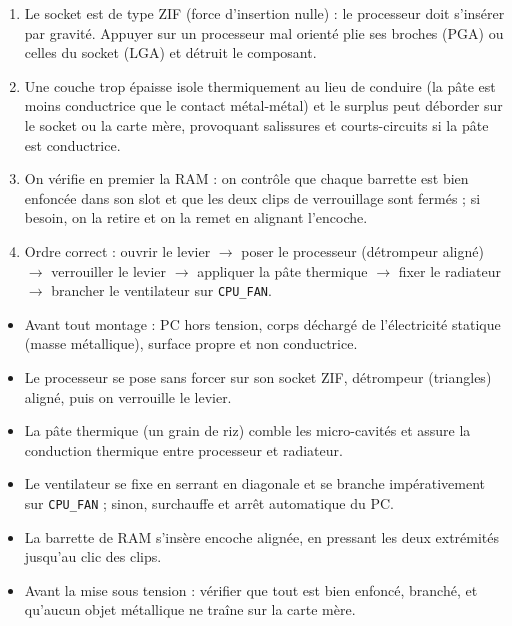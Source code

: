 \documentclass[11pt]{article}
\newcommand{\cle}[1]{{\popxbold\color{popdark}#1}}
\begin{document}
\begin{corrige}[Exercice]
\begin{enumerate}
  \item Le socket est de type ZIF (force d'insertion nulle) : le processeur doit s'insérer par gravité. Appuyer sur un processeur mal orienté plie ses broches (PGA) ou celles du socket (LGA) et détruit le composant.
  \item Une couche trop épaisse isole thermiquement au lieu de conduire (la pâte est moins conductrice que le contact métal-métal) et le surplus peut déborder sur le socket ou la carte mère, provoquant salissures et courts-circuits si la pâte est conductrice.
  \item On vérifie en premier la RAM : on contrôle que chaque barrette est bien enfoncée dans son slot et que les deux clips de verrouillage sont fermés ; si besoin, on la retire et on la remet en alignant l'encoche.
  \item Ordre correct : ouvrir le levier $\rightarrow$ poser le processeur (détrompeur aligné) $\rightarrow$ verrouiller le levier $\rightarrow$ appliquer la pâte thermique $\rightarrow$ fixer le radiateur $\rightarrow$ brancher le ventilateur sur \texttt{CPU\_FAN}.
\end{enumerate}
\end{corrige}

\begin{aretenir}
\begin{itemize}
  \item Avant tout montage : PC \cle{hors tension}, corps déchargé de l'\cle{électricité statique} (masse métallique), surface propre et non conductrice.
  \item Le processeur se pose \cle{sans forcer} sur son socket ZIF, détrompeur (triangles) aligné, puis on verrouille le levier.
  \item La \cle{pâte thermique} (un grain de riz) comble les micro-cavités et assure la conduction thermique entre processeur et radiateur.
  \item Le ventilateur se fixe en serrant \cle{en diagonale} et se branche impérativement sur \texttt{CPU\_FAN} ; sinon, surchauffe et arrêt automatique du PC.
  \item La barrette de RAM s'insère encoche alignée, en pressant les deux extrémités jusqu'au \cle{clic} des clips.
  \item Avant la mise sous tension : vérifier que tout est bien enfoncé, branché, et qu'\cle{aucun objet métallique} ne traîne sur la carte mère.
\end{itemize}
\end{aretenir}
\end{document}
